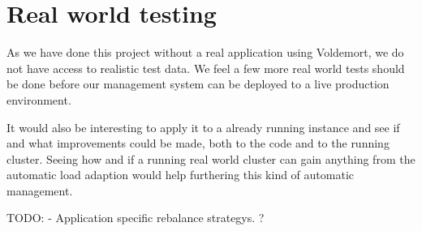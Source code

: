 \section{Real world testing}
As we have done this project without a real application using Voldemort, we do not have access to realistic test data. We feel a few more real world tests should be done before our management system can be deployed to a live production environment.

It would also be interesting to apply it to a already running instance and see if and what improvements could be made, both to the code and to the running cluster.
Seeing how and if a running real world cluster can gain anything from the automatic load adaption would help furthering this kind of automatic management.


TODO: - Application specific rebalance strategys. ?
